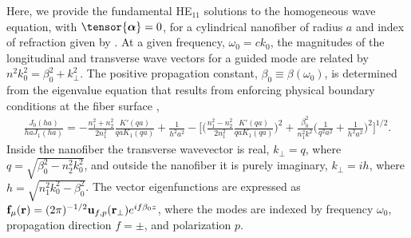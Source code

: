 \documentclass[preprint,aps,pra,onecolumn]{revtex4-1} %
\begin{document}
\begin{appendix}
Here, we provide the fundamental HE$_{11}$ solutions to the homogeneous wave equation,  with $\tensor{\boldsymbol{\alpha}} = 0$, for a cylindrical nanofiber of radius $a$ and index of refraction given by .  
At a given frequency, $\omega_0 = c k_0$, the magnitudes of the longitudinal and transverse wave vectors for a guided mode are related by $n^2 k_0^2 = \beta_0^2 + k_\perp^2$.  
The positive propagation constant, $\beta_0 \equiv \beta(\omega_0)$, is determined from the eigenvalue equation that results from enforcing physical boundary conditions at the fiber surface \cite{Yariv, Marcuse, Snyder and Love},
	\begin{align}
		\frac{J_0(ha)}{ha J_1(ha)} = - \frac{n_1^2+n_2^2}{2n_1^2} \frac{K'(qa)}{qa K_1(qa)} + \frac{1}{h^2 a^2} - \bigg[ \bigg(\frac{n_1^2 - n_2^2}{2 n_1^2} \frac{K'(qa)}{qa K_1(qa)} \bigg)^2  + \frac{\beta_0^2}{n^2_1 k^2} \bigg(\frac{1}{q^2a^2} + \frac{1}{h^2a^2} \bigg)^2 \bigg]^{1/2}.
	\end{align}
Inside the nanofiber the transverse wavevector is real, $k_\perp = q$, where $q=\sqrt{\beta_0^2- n_2^2k_0^2}$, and outside the nanofiber it is purely imaginary, $k_\perp = i h$, where $h=\sqrt{n_1^2 k_0^2 - \beta_0^2}$.  The vector eigenfunctions are expressed as $\mathbf{f}_{\mu}(\mathbf{r}) = (2\pi)^{-1/2}\mathbf{u}_{f,p}(\mathbf{r}_\perp) e^{i f \beta_0 z}$, where the modes are indexed by frequency $\omega_0$, propagation direction $f = \pm$, and polarization $p$.


\end{appendix}
\end{document}
